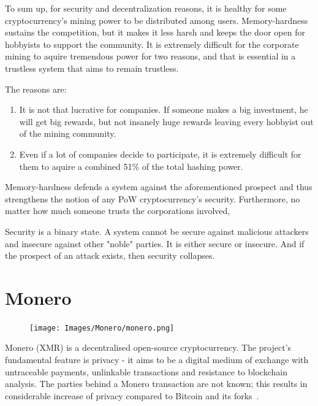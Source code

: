 To sum up, for security and decentralization reasons, it is healthy for some cryptocurrency's mining power to be distributed among users. Memory-hardness sustains the competition, but it makes it less harsh and keeps the door open for hobbyists to support the community. It is extremely difficult for the corporate mining to aquire tremendous power for two reasons, and that is essential in a trustless system that aims to remain trustless.

\noindent The reasons are:
\begin{enumerate}[label=(\greek*)]
  \item It is not that lucrative for companies. If someone makes a big investment, he will get big rewards, but not insanely huge rewards leaving every hobbyist out of the mining community.
  \item Even if a lot of companies decide to participate, it is extremely difficult for them to aquire a combined 51\% of the total hashing power.
\end{enumerate}

Memory-hardness defends a system against the aforementioned prospect and thus strengthens the notion of any PoW cryptocurrency's security. Furthermore, no matter how much someone trusts the corporations involved,
\\
\begin{tcolorbox}[colback=red!5!white,colframe=red!75!black,title=in the words of Edward Snowden:]
  Security is a binary state. A system cannot be secure against malicious attackers and insecure against other "noble" parties. It is either secure or insecure. And if the prospect of an attack exists, then security collapses.
\end{tcolorbox}
%
\section{\label{sec:Monero}Monero}
\begin{figure}
\centering
\texttt{[image: Images/Monero/monero.png]}
\end{figure}
Monero (XMR) is a decentralised open-source cryptocurrency. The project's fundamental feature is privacy - it aims to be a digital medium of exchange with untraceable payments, unlinkable transactions and resistance to blockchain analysis. The parties behind a Monero transaction are not known; this results in considerable increase of privacy compared to Bitcoin and its forks~\cite{monerodef}.

